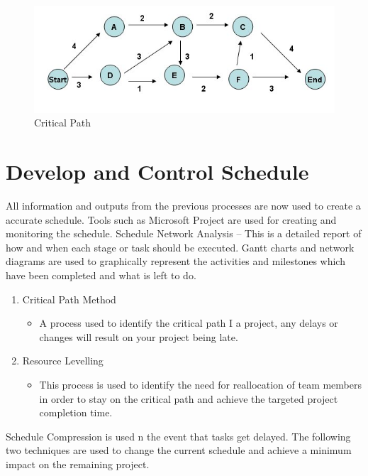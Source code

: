 \begin{figure} [H]
\begin{center}
\includegraphics[scale=0.7]{ch5.png}
\caption{Critical Path}
\label{fig:criticalpath}
\end{center}
\end{figure}

\section{Develop and Control Schedule}

All information and outputs from the previous processes are now used to create a accurate schedule. Tools such as Microsoft Project are used for creating and monitoring the schedule. 
Schedule Network Analysis – This is a detailed report of how and when each stage or task should be executed. Gantt charts and network diagrams are used to graphically represent the activities and milestones which have been completed and what is left to do. 

\begin{enumerate}
\item Critical Path Method
\begin{itemize}
\item A process used to identify the critical path I a project, any delays or changes will result on your project being late.
\end{itemize}
\item Resource Levelling
\begin{itemize}
\item This process is used to identify the need for reallocation of team members in order to stay on the critical path and achieve the targeted project completion time.
\end{itemize}
\end{enumerate}

Schedule Compression is used n the event that tasks get delayed. The following two techniques are used to change the current schedule and achieve a minimum impact on the remaining project. 

